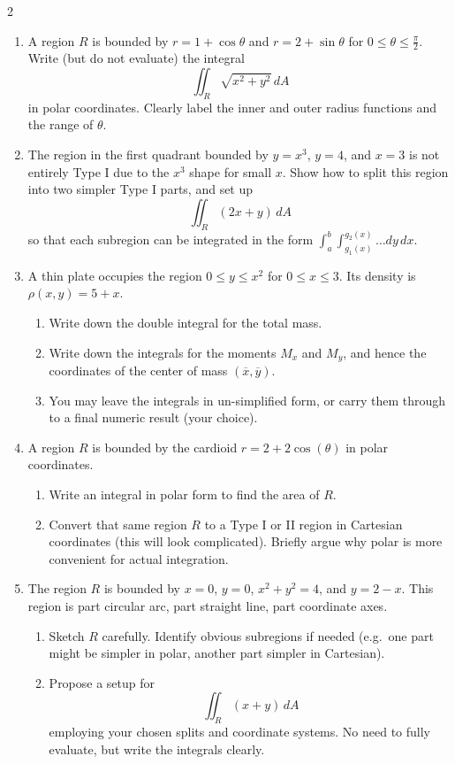 \begin{multicols}{2}
\begin{enumerate}
\item A region $R$ is bounded by $r = 1 + \cos\theta$ and $r = 2 + \sin\theta$ for $0 \le \theta \le \frac{\pi}{2}$. Write (but do not evaluate) the integral
\[
\iint_R \sqrt{x^2 + y^2} \, dA
\]
in polar coordinates. Clearly label the inner and outer radius functions and the range of $\theta$.

\item The region in the first quadrant bounded by $y = x^3$, $y = 4$, and $x=3$ is not entirely Type I due to the $x^3$ shape for small $x$. Show how to split this region into two simpler Type I parts, and set up
\[
\iint_R (2x + y)\,dA
\]
so that each subregion can be integrated in the form $\int_a^b \int_{g_1(x)}^{g_2(x)} \dots dy\,dx$.

\item A thin plate occupies the region $0 \le y \le x^2$ for $0 \le x \le 3$. Its density is $\rho(x,y) = 5 + x$.  
\begin{enumerate}
\item Write down the double integral for the total mass.  
\item Write down the integrals for the moments $M_x$ and $M_y$, and hence the coordinates of the center of mass $(\overline{x},\overline{y})$.  
\item You may leave the integrals in un-simplified form, or carry them through to a final numeric result (your choice).
\end{enumerate}

\item A region $R$ is bounded by the cardioid $r = 2 + 2\cos(\theta)$ in polar coordinates.  
\begin{enumerate}
\item Write an integral in polar form to find the area of $R$.  
\item Convert that same region $R$ to a Type I or II region in Cartesian coordinates (this will look complicated). Briefly argue why polar is more convenient for actual integration.
\end{enumerate}

\item The region $R$ is bounded by $x=0$, $y=0$, $x^2 + y^2 = 4$, and $y= 2 - x$. This region is part circular arc, part straight line, part coordinate axes.  
\begin{enumerate}
\item Sketch $R$ carefully. Identify obvious subregions if needed (e.g.\ one part might be simpler in polar, another part simpler in Cartesian).  
\item Propose a setup for 
\[
\iint_R (x + y)\, dA
\]
employing your chosen splits and coordinate systems. No need to fully evaluate, but write the integrals clearly.
\end{enumerate}


\end{enumerate}
\end{multicols}
